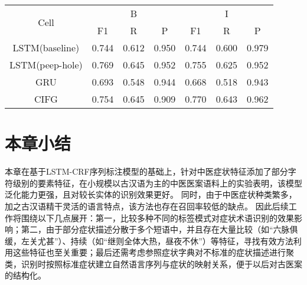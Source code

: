 \begin{table}[H]
    \centering
    \begin{tabular}{ccccccc}
        \toprule
            \multirow{2}{*}{Cell} & \multicolumn{3}{c}{B} & \multicolumn{3}{c}{I}\\
            \cmidrule(lr){2-4} \cmidrule(lr){5-7}
            & F1 & R & P & F1 & R & P\\
        \midrule
        {LSTM}{(baseline)} & 0.744&0.612&0.950&0.744&0.600&0.979\\
        {LSTM}{(peep-hole)} & 0.769&0.645&0.952&0.755&0.625&0.952\\
        {GRU} & 0.693&0.548&0.944&0.668&0.518&0.943\\
        {CIFG} & 0.754&0.645&0.909&0.770&0.643&0.962\\
        \bottomrule
    \end{tabular}
    \label{tab:tab2}
\end{table}

\section{本章小结}
本章在基于LSTM-CRF序列标注模型的基础上，针对中医症状特征添加了部分字符级别的要素特征，在小规模以古汉语为主的中医医案语料上的实验表明，该模型泛化能力更强，且对较长实体的识别效果更好。
同时，由于中医症状种类繁多，加之古汉语精干灵活的语言特点，该方法也存在召回率较低的缺点。
因此后续工作将围绕以下几点展开：第一，比较多种不同的标签模式对症状术语识别的效果影响；第二，由于部分症状描述分散于多个短语中，并且存在大量比较（如“六脉俱缓，左关尤甚”）、持续（如“继则全体大热，昼夜不休”）等特征，寻找有效方法利用这些特征也至关重要；最后还需考虑参照症状字典对不标准的症状描述进行聚类，识别时按照标准症状建立自然语言序列与症状的映射关系，便于以后对古医案的结构化。



